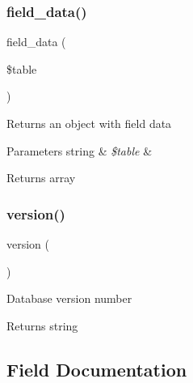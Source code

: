 \subsubsection{\texorpdfstring{field\+\_\+data()}{field\_data()}}
{\footnotesize\ttfamily field\+\_\+data (\begin{DoxyParamCaption}\item[{}]{\$table }\end{DoxyParamCaption})}

Returns an object with field data


\begin{DoxyParams}[1]{Parameters}
string & {\em \$table} & \\
\hline
\end{DoxyParams}
\begin{DoxyReturn}{Returns}
array 
\end{DoxyReturn}
\mbox{\label{class_c_i___d_b__pdo__oci__driver_a6080dae0886626b9a4cedb29240708b1}} 
\subsubsection{\texorpdfstring{version()}{version()}}
{\footnotesize\ttfamily version (\begin{DoxyParamCaption}{ }\end{DoxyParamCaption})}

Database version number

\begin{DoxyReturn}{Returns}
string 
\end{DoxyReturn}


\subsection{Field Documentation}
\mbox{\label{class_c_i___d_b__pdo__oci__driver_a06c80bac2ecbd0557827e96949c23097}} 
